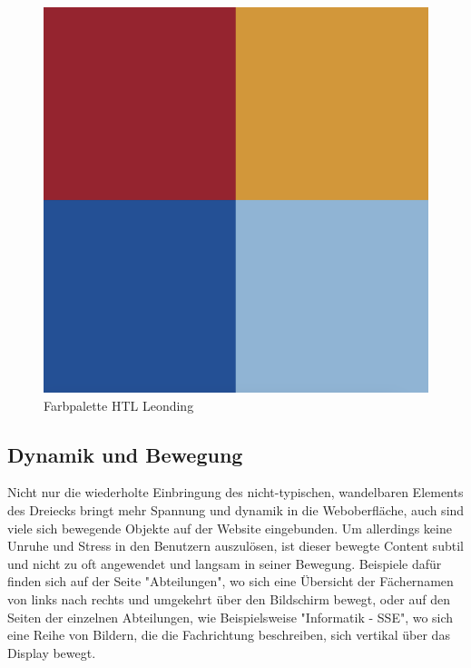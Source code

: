 \begin{figure}
   \begin{minipage}[b]{\linewidth} 
      \includegraphics[scale=0.3]{pics/Farbpalette.png}
      \caption{Farbpalette HTL Leonding}
      \label{fig:impl:Farbpalette}
   \end{minipage}
   \hspace{.05\linewidth}
\end{figure}

\subsection{Dynamik und Bewegung}
Nicht nur die wiederholte Einbringung des nicht-typischen, wandelbaren Elements des Dreiecks
bringt mehr Spannung und dynamik in die Weboberfläche, auch sind viele sich bewegende Objekte auf 
der Website eingebunden. Um allerdings keine Unruhe und Stress in den Benutzern auszulösen, ist dieser
bewegte Content subtil und nicht zu oft angewendet und langsam in seiner Bewegung. Beispiele dafür finden sich 
auf der Seite "Abteilungen", wo sich eine Übersicht der Fächernamen von links nach rechts und umgekehrt
über den Bildschirm bewegt, oder auf den Seiten der einzelnen Abteilungen, wie Beispielsweise "Informatik - SSE", 
wo sich eine Reihe von Bildern, die die Fachrichtung beschreiben, sich vertikal über das Display bewegt.


